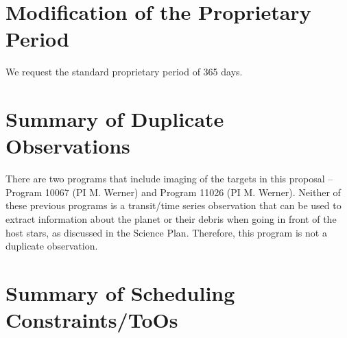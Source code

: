 \documentclass[letterpaper,12pt]{article}
\begin{document}
\section{Modification of the Proprietary Period}

We request the standard proprietary period of 365 days.

\section{Summary of Duplicate Observations}


There are two programs that include imaging of the targets in this proposal -- Program 10067 (PI M. Werner) and Program 11026 (PI M. Werner).
Neither of these previous programs is a transit/time series observation that can be used to extract information about the planet or their debris when going in front of the host stars, as discussed in the Science Plan.
Therefore, this program is not a duplicate observation.

%
%
%


\section{Summary of Scheduling Constraints/ToOs}
\end{document}
